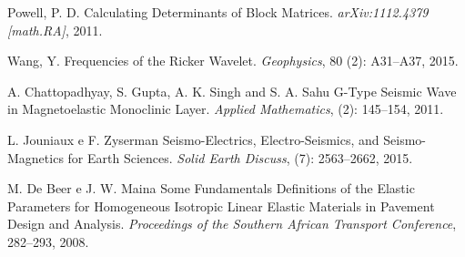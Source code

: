 \documentclass[12pt,a4paper,oneside]{abntex2}
\begin{document}
\begin{thebibliography}{25}
  
  
Powell, P. D.
\newblock Calculating Determinants of Block Matrices.
\newblock \emph{arXiv:1112.4379 [math.RA]}, 2011.


Wang, Y.
\newblock Frequencies of the Ricker Wavelet.
\newblock \emph{Geophysics}, 80
  (2): A31--A37, 2015.
  
A. Chattopadhyay, S. Gupta, A. K. Singh and S. A. Sahu
\newblock G-Type Seismic Wave in Magnetoelastic Monoclinic Layer.
\newblock \emph{Applied Mathematics}, 
  (2): 145--154, 2011.
  
 L. Jouniaux e F. Zyserman
\newblock Seismo-Electrics, Electro-Seismics, and
Seismo-Magnetics for Earth Sciences.
\newblock \emph{Solid Earth Discuss}, 
  (7): 2563--2662, 2015.
  
 M. De Beer e J. W. Maina
\newblock Some Fundamentals Definitions of the Elastic Parameters for Homogeneous Isotropic Linear Elastic Materials in Pavement Design and Analysis.
\newblock \emph{Proceedings of the Southern African Transport Conference}, 282--293, 2008.


\end{thebibliography}

\appendix

\end{document}
